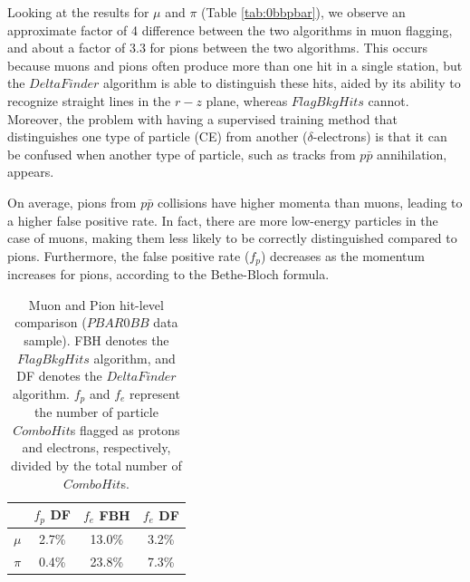       Looking at the results for $\mu$ and $\pi$ (Table \ref{tab:0bbpbar}), 
      we observe an approximate factor of 4 difference between the two algorithms 
      in muon flagging, and about a factor of 3.3 for pions 
      between the two algorithms. This occurs 
      because muons and pions often produce more than one hit in a single station, 
      but the $DeltaFinder$ algorithm is able to distinguish these hits, aided by 
      its ability to recognize straight lines in the $r-z$ plane, whereas 
      $FlagBkgHits$ cannot. Moreover, the problem with having a supervised 
      training method that distinguishes one type of particle (CE) from another ($\delta$-electrons)
      is that it can be confused when another type of particle, such as 
      tracks from $p\bar{p}$ annihilation, appears. 
      
      On average, pions from $p\bar{p}$ collisions have higher 
      momenta than muons, leading to a higher false positive rate. In fact, 
      there are more low-energy particles in the case of muons, making them 
      less likely to be correctly distinguished compared to pions. Furthermore, 
      the false positive rate ($f_p$) decreases as the momentum increases for pions, 
      according to the Bethe-Bloch formula.

    \begin{center}
        \begin{table}[h!]
        \centering
        \renewcommand{\arraystretch}{1.}
        \begin{tabular}{| c | c | c | c|} 
        \hline
         &  $f_{p}$ DF &  $f_{e}$ FBH & $f_{e}$ DF\\
        \hline
        $\mu$  &  2.7\%  & 13.0\% & 3.2\%\\
        \hline
        $\pi$ & 0.4\% & 23.8\%& 7.3\%\\
        \hline
        \end{tabular}
        \caption[Muon and Pion hit-level comparison.]{Muon and Pion 
        hit-level comparison ($PBAR0BB$ data sample). FBH denotes 
        the $FlagBkgHits$ algorithm, and DF denotes the $DeltaFinder$ algorithm. $f_p$ and $f_e$ represent 
        the number of particle $ComboHit$s flagged as protons and electrons, respectively, 
        divided by the total number of $ComboHit$s.}
        \end{table}\label{tab:0bbpbar}
        \end{center}


